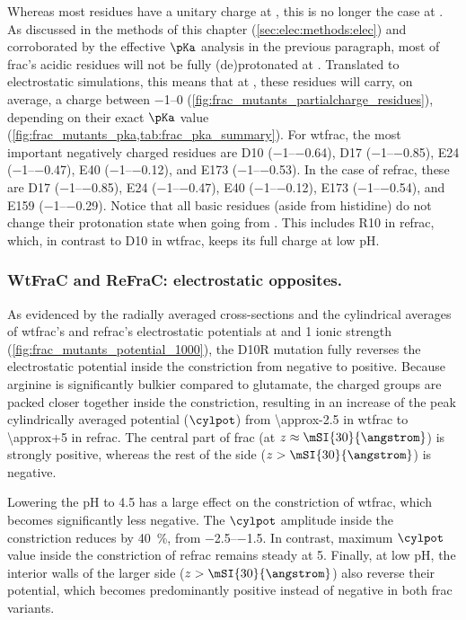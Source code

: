 Whereas most residues have a unitary charge at , this is no longer the case at . As discussed
in the methods of this chapter (\cref{sec:elec:methods:elec}) and corroborated by the effective $\pKa$
analysis in the previous paragraph, most of \gls{frac}'s acidic residues will not be fully (de)protonated
at . Translated to electrostatic simulations, this means that at , these residues will carry,
on average, a charge between \SIrange{-1}{0}{\ec} (\cref{fig:frac_mutants_partialcharge_residues}), depending
on their exact $\pKa$ value (\cref{fig:frac_mutants_pka,tab:frac_pka_summary}). For \gls{wtfrac}, the most
important negatively charged residues are D10 (\SIrange{-1}{-0.64}{\ec}), D17 (\SIrange{-1}{-0.85}{\ec}), E24
(\SIrange{-1}{-0.47}{\ec}), E40 (\SIrange{-1}{-0.12}{\ec}), and E173 (\SIrange{-1}{-0.53}{\ec}). In the case
of \gls{refrac}, these are D17 (\SIrange{-1}{-0.85}{\ec}), E24 (\SIrange{-1}{-0.47}{\ec}), E40
(\SIrange{-1}{-0.12}{\ec}), E173 (\SIrange{-1}{-0.54}{\ec}), and E159 (\SIrange{-1}{-0.29}{\ec}). Notice that
all basic residues (aside from histidine) do not change their protonation state when going from
. This includes R10 in \gls{refrac}, which, in contrast to D10 in \gls{wtfrac}, keeps its
full charge at low pH.

\subsubsection{WtFraC and ReFraC: electrostatic opposites.}
%

As evidenced by the radially averaged cross-sections and the cylindrical averages of \gls{wtfrac}'s and
\gls{refrac}'s electrostatic potentials at  and \SI{1}{\Molar} ionic strength
(\cref{fig:frac_mutants_potential_1000}), the D10R mutation fully reverses the electrostatic potential inside
the constriction from negative to positive. Because arginine is significantly bulkier compared to glutamate,
the charged groups are packed closer together inside the constriction, resulting in an increase of the peak
cylindrically averaged potential ($\cylpot$) from \SI{\approx-2.5}{\kTe} in \gls{wtfrac} to
\SI{\approx+5}{\kTe} in \gls{refrac}. The central part of \gls{frac} (at $z \approx
\mSI{30}{\angstrom}$) is strongly positive, whereas the rest of the \cisi{} side ($z > \mSI{30}{\angstrom}$)
is negative.

Lowering the pH to \num{4.5} has a large effect on the constriction of \gls{wtfrac}, which becomes
significantly less negative. The $\cylpot$ amplitude inside the constriction reduces by \SI{40}{\percent},
from \SIrange{-2.5}{-1.5}{\kTe}. In contrast, maximum $\cylpot$ value inside the constriction of \gls{refrac}
remains steady at \SI{+5}{\kTe}. Finally, at low pH, the interior walls of the larger
\cisi{} side ($z > \mSI{30}{\angstrom}$) also reverse their potential, which becomes predominantly positive
instead of negative in both \gls{frac} variants.

